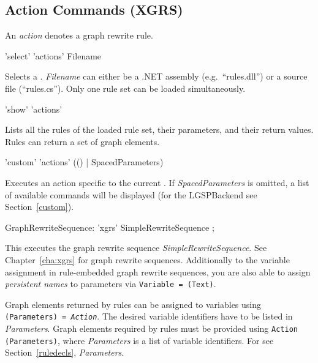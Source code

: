 \subsection{Action Commands (XGRS)}
\label{grsthings}
An \emph{action} denotes a graph rewrite rule.

\begin{rail}
  'select' 'actions' Filename
\end{rail}
Selects a .
\emph{Filename} can either be a .NET assembly (e.g.\ ``rules.dll'') or a source file (``rules.cs'').
Only one rule set can be loaded simultaneously.

\begin{rail}
  'show' 'actions'
\end{rail}
Lists all the rules of the loaded rule set, their parameters, and their return values.
Rules can return a set of graph elements.

\begin{rail}
  'custom' 'actions' (() | SpacedParameters)
\end{rail}
Executes an action specific to the current . 
If \emph{SpacedParameters} is omitted, a list of available commands will be displayed (for the LGSPBackend see Section~\ref{custom}).

\makeatletter
\begin{rail}
  GraphRewriteSequence: 'xgrs' SimpleRewriteSequence ;
\end{rail}
This executes the graph rewrite sequence \emph{SimpleRewriteSequence}.
See Chapter~\ref{cha:xgrs} for graph rewrite sequences.
Additionally to the variable assignment in rule-embedded graph rewrite sequences, you are also able to assign \emph{persistent names} to parameters via  \texttt{Variable = \@(Text)}.

Graph elements returned by rules can be assigned to variables using \texttt{(Para\-meters) = \emph{Action}}. 
The desired variable identifiers have to be listed in \emph{Parameters}. 
Graph elements required by rules must be provided using \texttt{Action (Para\-meters)}, where \emph{Parameters} is a list of variable identifiers. 
For  see Section~\ref{ruledecls}, \emph{Parameters}.

